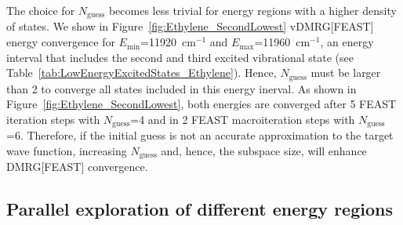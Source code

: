 \documentclass[journal=jctcce]{achemso}
\begin{document}
\noindent The choice for $N_\text{guess}$ becomes less trivial for energy regions with a higher density of states.
We show in Figure~\ref{fig:Ethylene_SecondLowest} vDMRG[FEAST] energy convergence for $E_\text{min}$=11920~cm$^{-1}$ and $E_\text{max}$=11960~cm$^{-1}$, an energy interval that includes the second and third excited vibrational state (see Table~\ref{tab:LowEnergyExcitedStates_Ethylene}).
Hence, $N_\text{guess}$ must be larger than 2 to converge all states included in this energy inerval.
As shown in Figure~\ref{fig:Ethylene_SecondLowest}, both energies are converged after 5 FEAST iteration steps with $N_\text{guess}$=4 and in 2 FEAST macroiteration steps with $N_\text{guess}$=6.
Therefore, if the initial guess is not an accurate approximation to the target wave function, increasing $N_\text{guess}$ and, hence, the subspace size, will enhance DMRG[FEAST] convergence.


\subsection{Parallel exploration of different energy regions}
\end{document}
